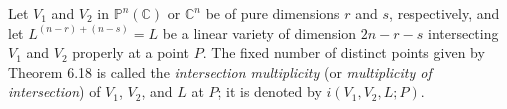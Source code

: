 Let $V_1$ and $V_2$ in $\mathbb{P}^n(\mathbb{C})$ or $\mathbb{C}^n$ be of pure dimensions $r$ and $s$, respectively, and let $L^{(n-r)+(n-s)} = L$ be a linear variety of dimension $2n - r - s$ intersecting $V_1$ and $V_2$ properly at a point $P$. The fixed number of distinct points given by Theorem 6.18 is called the \textit{intersection multiplicity} (or \textit{multiplicity of intersection}) of $V_1$, $V_2$, and $L$ at $P$; it is denoted by $i(V_1, V_2, L; P)$.
